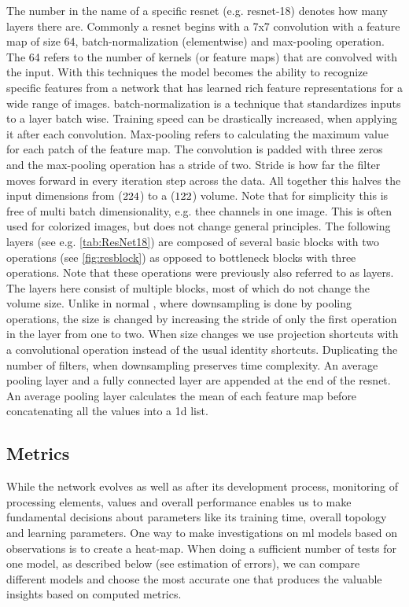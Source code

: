 The number in the name of a specific \acrshort{resnet} (e.g. \acrshort{resnet}-18) denotes how many layers there are. Commonly a \acrshort{resnet} begins with a 7x7 convolution with a feature map of size 64, \gls{batch-normalization} (elementwise) and max-pooling operation. The 64 refers to the number of kernels (or feature maps) that are convolved with the input. With this techniques the model becomes the ability to recognize specific features from a network that has learned rich feature representations for a wide range of images. \gls{batch-normalization} is a technique that standardizes inputs to a layer batch wise. Training speed can be drastically increased, when applying it after each convolution. \cite{Brownlee.2019} Max-pooling refers to calculating the maximum value for each patch of the feature map. The convolution is padded with three zeros and the max-pooling operation has a stride of two. Stride is how far the filter moves forward in every iteration step across the data. All together this halves the input dimensions from (\( 224 \time 224 \time 1\)) to a (\( 122 \time 122 \time 64 \)) volume. Note that for simplicity this is free of multi batch dimensionality, e.g. thee channels in one image. This is often used for colorized images, but does not change general principles. The following layers (see e.g. \cref{tab:ResNet18}) are composed of several basic blocks with two operations (see \cref{fig:resblock}) as opposed to bottleneck blocks with three operations. \cite{He.12102015} Note that these operations were previously also referred to as layers. The layers here consist of multiple blocks, most of which do not change the volume size. Unlike in normal , where downsampling is done by pooling operations, the size is changed by increasing the stride of only the first operation in the layer from one to two. When size changes we use projection shortcuts with a convolutional operation instead of the usual identity shortcuts. Duplicating the number of filters, when downsampling preserves time complexity. An average pooling layer and a fully connected layer are appended at the end of the \acrshort{resnet}. An average pooling layer calculates the mean of each feature map before concatenating all the values into a \acrfull{1d} list. \cite{He.12102015}

\subsection{Metrics}

While the network evolves as well as after its development process, monitoring of processing elements, values and overall performance enables us to make fundamental decisions about parameters like its training time, overall topology and learning parameters. One way to make investigations on \acrshort{ml} models based on observations is to create a \gls{heat-map}. When doing a sufficient number of tests for one model, as described below (see estimation of errors), we can compare different models and choose the most accurate one that produces the valuable insights based on computed metrics.

